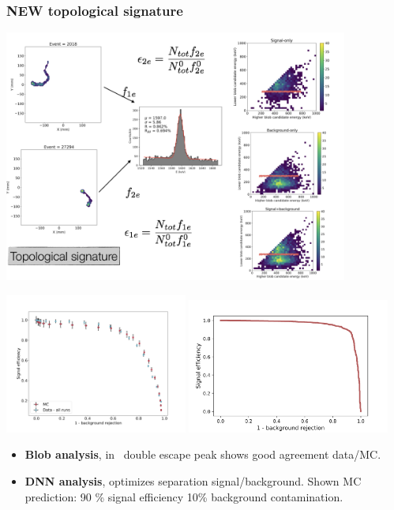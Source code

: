 \begin{frame}
 \frametitle{NEW topological signature} 
 \begin{center}
\includegraphics[width=0.85\textwidth]{moriond/new_topo_doublescape.png}
\end{center}
\end{frame}

\begin{frame}
 \begin{center}
 \includegraphics[width=0.45\textwidth]{moriond/new_topo_data_mc.png}
\includegraphics[width=0.50\textwidth]{moriond/eff_vs_bkg_dnn.png}
\end{center}

\begin{itemize}
\item {\bf Blob analysis}, in \TL\ double escape peak shows good agreement data/MC. 
\item {\bf DNN analysis}, optimizes separation signal/background. Shown MC prediction: 90 \% signal efficiency 10\% background contamination. 
\end{itemize}
\end{frame}





